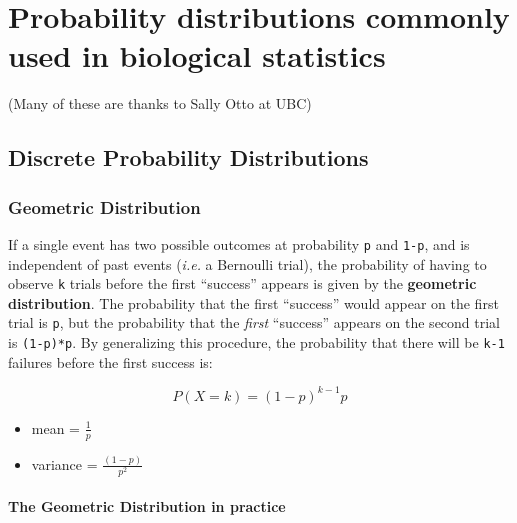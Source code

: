\documentclass[]{book}
\providecommand{\tightlist}{%
  \setlength{\itemsep}{0pt}\setlength{\parskip}{0pt}}
\let\oldparagraph\paragraph
\renewcommand{\paragraph}[1]{\oldparagraph{#1}\mbox{}}
\begin{document}
\hypertarget{probability-distributions-commonly-used-in-biological-statistics}{%
\section{Probability distributions commonly used in biological statistics}\label{probability-distributions-commonly-used-in-biological-statistics}}

(Many of these are thanks to Sally Otto at UBC)

\hypertarget{discrete-probability-distributions}{%
\subsection{Discrete Probability Distributions}\label{discrete-probability-distributions}}

\hypertarget{geometric-distribution}{%
\subsubsection{\texorpdfstring{\textbf{Geometric Distribution}}{Geometric Distribution}}\label{geometric-distribution}}

If a single event has two possible outcomes at probability \texttt{p} and \texttt{1-p}, and is independent of past events (\emph{i.e.} a Bernoulli trial), the probability of having to observe \texttt{k} trials before the first ``success'' appears is given by the \textbf{geometric distribution}. The probability that the first ``success'' would appear on the first trial is \texttt{p}, but the probability that the \emph{first} ``success'' appears on the second trial is \texttt{(1-p)*p}. By generalizing this procedure, the probability that there will be \texttt{k-1} failures before the first success is:

\[P(X=k)=(1-p)^{k-1}p\]

\begin{itemize}
\tightlist
\item
  mean = \(\frac{1}{p}\)
\item
  variance = \(\frac{(1-p)}{p^2}\)
\end{itemize}

\hypertarget{the-geometric-distribution-in-practice}{%
\paragraph{\texorpdfstring{The \textbf{Geometric Distribution} in practice}{The Geometric Distribution in practice}}\label{the-geometric-distribution-in-practice}}
\end{document}
